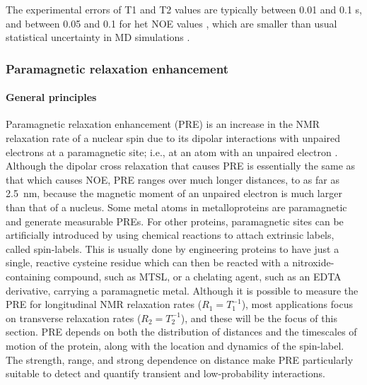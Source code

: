 \documentclass[9pt,review]{livecoms}
\begin{document}
The experimental errors of T1 and T2 values are typically between 0.01 and 0.1 s, and between 0.05 and 0.1 for het NOE values \cite{hoch_biological_2023}, which are smaller than usual statistical uncertainty in MD simulations \cite{sandelin_qebss_2024}.

\subsubsection{Paramagnetic relaxation enhancement}
\label{sub2:pre}

\paragraph{General principles}

Paramagnetic relaxation enhancement (PRE) is an increase in the NMR relaxation rate of a nuclear spin due to its dipolar interactions with unpaired electrons at a paramagnetic site; i.e., at an atom with an unpaired electron \cite{clore_elucidating_2007,clore2009theory}.
Although the dipolar cross relaxation that causes PRE is essentially the same as that which causes NOE, PRE ranges over much longer distances, to as far as \qty{2.5}{\nano\meter}, because the magnetic moment of an unpaired electron is much larger than that of a nucleus.
Some metal atoms in metalloproteins are paramagnetic and generate measurable PREs.
For other proteins, paramagnetic sites can be artificially introduced by using chemical reactions to attach extrinsic labels, called spin-labels.
This is usually done by engineering proteins to have just a single, reactive cysteine residue which can then be reacted with a nitroxide-containing compound, such as MTSL, or a chelating agent, such as an EDTA derivative, carrying a paramagnetic metal.
Although it is possible to measure the PRE for longitudinal NMR relaxation rates ($R_1=T_1^{-1}$), most applications focus on transverse relaxation rates ($R_2=T_2^{-1}$), and these will be the focus of this section.
PRE depends on both the distribution of distances and the timescales of motion of the protein, along with the location and dynamics of the spin-label.
The strength, range, and strong dependence on distance make PRE particularly suitable to detect and quantify transient and low-probability interactions.
\end{document}
